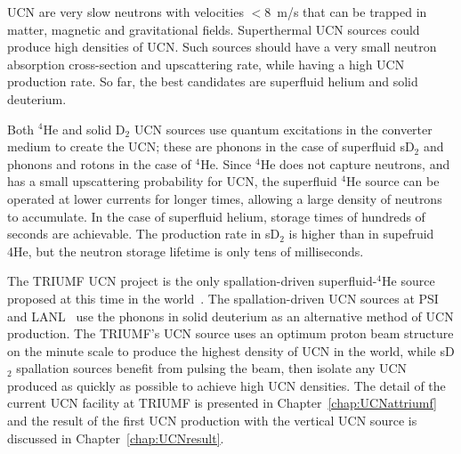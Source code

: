 UCN are very slow neutrons with velocities $<8$~m/s that can be
trapped in matter, magnetic and gravitational fields.  Superthermal
UCN sources could produce high densities of UCN. Such sources should
have a very small neutron absorption cross-section and upscattering
rate, while having a high UCN production rate. So far, the best
candidates are superfluid helium and solid deuterium.

Both $^4$He and solid D$_2$ UCN sources use quantum excitations in the
converter medium to create the UCN; these are phonons in the case of
superfluid sD$_2$ and phonons and rotons in the case of $^4$He. Since
$^4$He does not capture neutrons, and has a small upscattering
probability for UCN, the superfluid $^4$He source can be operated at
lower currents for longer times, allowing a large density of neutrons
to accumulate. In the case of superfluid helium, storage times of
hundreds of seconds are achievable. The production rate in sD$_2$ is
higher than in supefruid 4He, but the neutron storage lifetime is only
tens of milliseconds.

The TRIUMF UCN project is the only spallation-driven superfluid-$^4$He
source proposed at this time in the world~\cite{Ruediger}. The
spallation-driven UCN sources at PSI~\cite{Ries_ascona} and
LANL~\cite{Ito_ascona} use the phonons in solid deuterium as an
alternative method of UCN production.
The TRIUMF's UCN source uses an optimum proton beam structure on the
minute scale to produce the highest density of UCN in the world, while
sD$_2$ spallation sources benefit from pulsing the beam, then isolate
any UCN produced as quickly as possible to achieve high UCN densities.
The detail of the current UCN facility at TRIUMF is presented in
Chapter~\ref{chap:UCNattriumf} and the result of the first UCN
production with the vertical UCN source is discussed in
Chapter~\ref{chap:UCNresult}.










